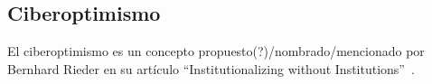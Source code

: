\subsection{Ciberoptimismo}

El ciberoptimismo es un concepto propuesto(?)/nombrado/mencionado por Bernhard Rieder en su artículo ``Institutionalizing without Institutions''~\autocite{Rieder2012}.

\begin{comment}
[Rieder2012]

"The central point that I have tried to make over these pages is that the major fault of contempo-
rary cyber-optimism is perhaps not simply its technological determinism, but a tendency towards
an essentialist view of both technology and democracy that eschews the complexities and deep
contradictions that characterize both." (Schlussfolgerung)

"One of the most common claims frames the Internet as a force of democratization. Appearing
recently in conjunction with the “Web 2.0” phenomenon, it portrays network technology as an
agent of decentralization that will bring an end to cultural hierarchies"
Idealerweise: Bildungsauftrag, Empowerment, aber in der Realitaet wenige verstehen wirklich was da so geht und deshalb bleibt die Arbeit auch an einigen wenigen Menschen haengen.

"In this “cyber-optimistic” viewpoint, the Internet is the agent of a
“capillary revolution” that is set to bring decentralization, equality, and democracy."

"the Internet allows capillary configurations
of power – local initiatives, ad-hoc pressure groups, fan cultures, “issue publics” – to challenge
the statutory powers that be. "
Allerdings:
Wird argumentiert, dass alle mitmachen koennen, das stimmt aber nicth so direkt.
Koloniale Zusammenhaenge bestehen;
Geographische Schwierigkeiten;
Oekonom. Probleme (oft in Kombi mit schwierigem Terrain); --> Kommerzielle Provider haben kein Interesse
Staatliche Repression --> dem Staat passt nicht dass X oder Y kommunizieren kann und eine oeffentliche Plattform hat

"while for communitarians the digital world mir-
rors the values of egalitarian forms of direct democracy and grassroots networking.” (Norris
2001, p. 232)"

"the convergence of this mutating counterculture with laissez-faire capitalism"
--> vlt kritische Perspektive: community networks as counterculture, aber andererseits spielen sie dem Staat teilweise in die Haende (laissez-faire capitalism, vgl Interview Gui)


\end{comment}
